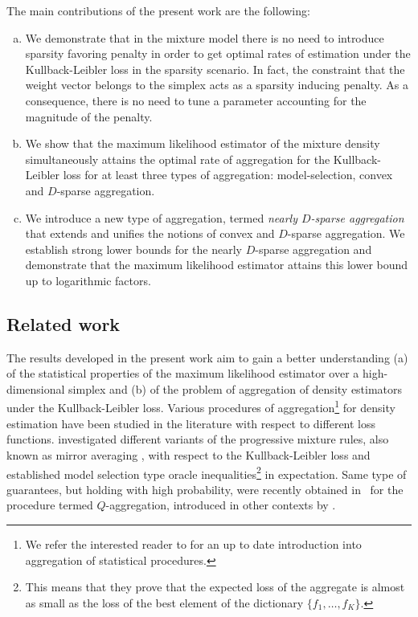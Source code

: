 The main contributions of the present work are the following:
\begin{enumerate}[(a)]
\item We demonstrate that in the mixture model there is no need to introduce sparsity favoring penalty in order to
get optimal rates of estimation under the Kullback-Leibler loss in the sparsity scenario. In fact, the constraint
that the weight vector belongs to the simplex acts as a sparsity inducing penalty. As a consequence, there is no
need to tune a parameter accounting for the magnitude of the penalty.
\item We show that the maximum likelihood estimator of the mixture density simultaneously attains the optimal rate
of aggregation for the Kullback-Leibler loss for at least three types of aggregation: model-selection, convex and
$D$-sparse aggregation.
\item We introduce a new type of aggregation, termed \textit{nearly $D$-sparse aggregation} that extends and unifies
the notions of convex and $D$-sparse aggregation. We establish strong lower bounds for the nearly $D$-sparse aggregation
and demonstrate that the maximum likelihood estimator attains this lower bound up to logarithmic factors.
\end{enumerate}

\subsection{Related work}\label{ssec:rel_work}

The results developed in the present work aim to gain a better understanding (a) of the statistical properties of the
maximum likelihood estimator over a high-dimensional simplex and (b) of the problem of aggregation of density estimators
under the Kullback-Leibler loss. Various procedures of aggregation\footnote{We refer the interested reader to \citep{TsybICM}
for an up to date introduction into aggregation of statistical procedures.} for density estimation have been studied in the literature
with respect to different loss functions. \citep{Catoni97,Yang2000,JRT} investigated different variants of the progressive
mixture rules, also known as mirror averaging \citep{YNTV,DT12a}, with respect to the Kullback-Leibler loss and established
model selection type oracle inequalities\footnote{This means that they prove that the expected loss of the aggregate is
almost as small as the loss of the best element of the dictionary $\{f_1,\ldots,f_K\}$.} in expectation. Same type of guarantees,
but holding with high probability, were recently obtained in~\citep{Bellec2014,Butucea1} for the procedure termed $Q$-aggregation,
introduced in other contexts by \citep{Dai,Rigollet12}.

